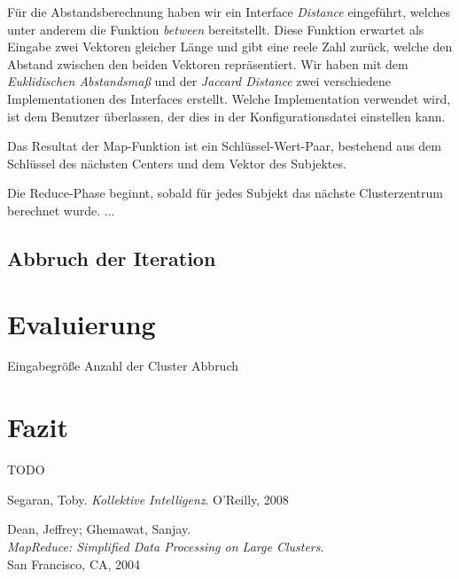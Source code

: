 \documentclass[a4paper]{llncs}
\begin{document}
Für die Abstandsberechnung haben wir ein Interface \emph{Distance} eingeführt, welches unter anderem die Funktion \emph{between} bereitstellt.
Diese Funktion erwartet als Eingabe zwei Vektoren gleicher Länge und gibt eine reele Zahl zurück, welche den Abstand zwischen den beiden Vektoren repräsentiert.
Wir haben mit dem \emph{Euklidischen Abstandsmaß} und der \emph{Jaccard Distance} zwei verschiedene Implementationen des Interfaces erstellt.
Welche Implementation verwendet wird, ist dem Benutzer überlassen, der dies in der Konfigurationsdatei einstellen kann.

Das Resultat der Map-Funktion ist ein Schlüssel-Wert-Paar, bestehend aus dem Schlüssel des nächsten Centers und dem Vektor des Subjektes.

Die Reduce-Phase beginnt, sobald für jedes Subjekt das nächste Clusterzentrum berechnet wurde. ...

\subsection{Abbruch der Iteration}

\section{Evaluierung}
Eingabegröße
Anzahl der Cluster
Abbruch

\section{Fazit}
TODO

\begin{thebibliography}{------------}

  Segaran, Toby.
  {\em Kollektive Intelligenz}.
  O'Reilly, 2008

  Dean, Jeffrey; Ghemawat, Sanjay.\\
  {\em MapReduce: Simplified Data Processing on Large Clusters}.\\
  San Francisco, CA, 2004
   
\end{thebibliography}
\end{document}
